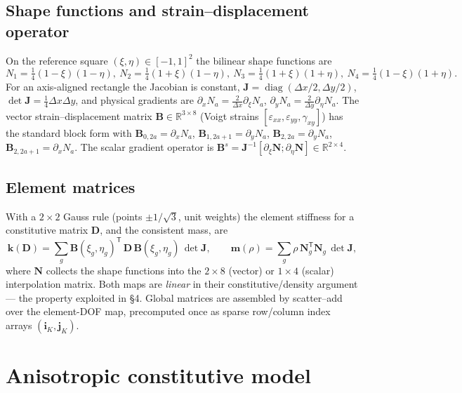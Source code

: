 \documentclass[11pt]{article}
\newcommand{\vB}{\mathbf{B}}
\newcommand{\vD}{\mathbf{D}}
\newcommand{\vN}{\mathbf{N}}
\newcommand{\T}{^{\mathsf{T}}}
\begin{document}
\subsection{Shape functions and strain--displacement operator}
On the reference square $(\xi,\eta)\in[-1,1]^2$ the bilinear shape functions are
\begin{equation}
  N_1=\tfrac14(1-\xi)(1-\eta),\ N_2=\tfrac14(1+\xi)(1-\eta),\
  N_3=\tfrac14(1+\xi)(1+\eta),\ N_4=\tfrac14(1-\xi)(1+\eta).
\end{equation}
For an axis-aligned rectangle the Jacobian is constant,
$\mathbf{J}=\operatorname{diag}(\Delta x/2,\Delta y/2)$, $\det\mathbf{J}=
\tfrac14\Delta x\Delta y$, and physical gradients are
$\partial_x N_a=\tfrac{2}{\Delta x}\partial_\xi N_a$,
$\partial_y N_a=\tfrac{2}{\Delta y}\partial_\eta N_a$. The vector
strain--displacement matrix $\vB\in\mathbb{R}^{3\times8}$ (Voigt strains
$[\varepsilon_{xx},\varepsilon_{yy},\gamma_{xy}]$) has the standard block form
with $\vB_{0,2a}=\partial_xN_a$, $\vB_{1,2a+1}=\partial_yN_a$,
$\vB_{2,2a}=\partial_yN_a$, $\vB_{2,2a+1}=\partial_xN_a$. The scalar gradient
operator is $\vB^{s}=\mathbf{J}^{-1}[\partial_\xi\mathbf{N};\partial_\eta
\mathbf{N}]\in\mathbb{R}^{2\times4}$.

\subsection{Element matrices}
With a $2\times2$ Gauss rule (points $\pm1/\sqrt3$, unit weights) the element
stiffness for a constitutive matrix $\vD$, and the consistent mass, are
\begin{equation}
  \mathbf{k}(\vD)=\sum_{g}\vB(\xi_g,\eta_g)\T\,\vD\,\vB(\xi_g,\eta_g)\,\det\mathbf{J},
  \qquad
  \mathbf{m}(\rho)=\sum_{g}\rho\,\vN_g\T\vN_g\,\det\mathbf{J},
  \label{eq:elemmats}
\end{equation}
where $\vN$ collects the shape functions into the $2\times8$ (vector) or
$1\times4$ (scalar) interpolation matrix. Both maps are \emph{linear} in their
constitutive/density argument --- the property exploited in \S4. Global matrices
are assembled by scatter--add over the element-DOF map, precomputed once as
sparse row/column index arrays $(\mathbf{i}_K,\mathbf{j}_K)$.

\section{Anisotropic constitutive model}
\end{document}
